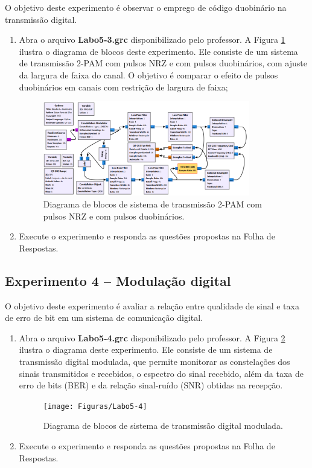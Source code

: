 \documentclass[12pt,addpoints]{exam}
\begin{document}
O objetivo deste experimento é observar o emprego de código duobinário na transmissão digital.
\begin{enumerate}
    \item Abra o arquivo \textbf{Labo5-3.grc} disponibilizado pelo professor. A Figura \ref{fig:GRC_5-3} ilustra o diagrama de blocos deste experimento. Ele consiste de um sistema de transmissão 2-PAM com pulsos NRZ e com pulsos duobinários, com ajuste da largura de faixa do canal. O objetivo é comparar o efeito de pulsos duobinários em canais com restrição de largura de faixa;
    \begin{figure}[htb]
        \centering
        \includegraphics[width=0.85\textwidth]{Figuras/Labo5-3}
        \caption{Diagrama de blocos de sistema de transmissão 2-PAM com pulsos NRZ e com pulsos duobinários.} 
        \label{fig:GRC_5-3}
    \end{figure}
  \item Execute o experimento e responda as questões propostas na Folha de Respostas.
\end{enumerate}

 \subsection{Experimento 4 -- Modulação digital}

O objetivo deste experimento é avaliar a relação entre qualidade de sinal e taxa de erro de bit em um sistema de comunicação digital.
 \begin{enumerate}
     \item  Abra o arquivo \textbf{Labo5-4.grc} disponibilizado pelo professor. A Figura \ref{fig:GRC_5-4} ilustra o diagrama deste experimento. Ele consiste de um sistema de transmissão digital modulada, que permite monitorar as constelações dos sinais transmitidos e recebidos, o espectro do sinal recebido, além da taxa de erro de bits (BER) e da relação sinal-ruído (SNR) obtidas na recepção.
     \begin{figure}[htb]
         \centering
         \texttt{[image: Figuras/Labo5-4]}
         \caption{Diagrama de blocos de sistema de transmissão digital modulada.} 
         \label{fig:GRC_5-4}
     \end{figure}
   \item Execute o experimento e responda as questões propostas na Folha de Respostas.
\end{enumerate}
\end{document}
